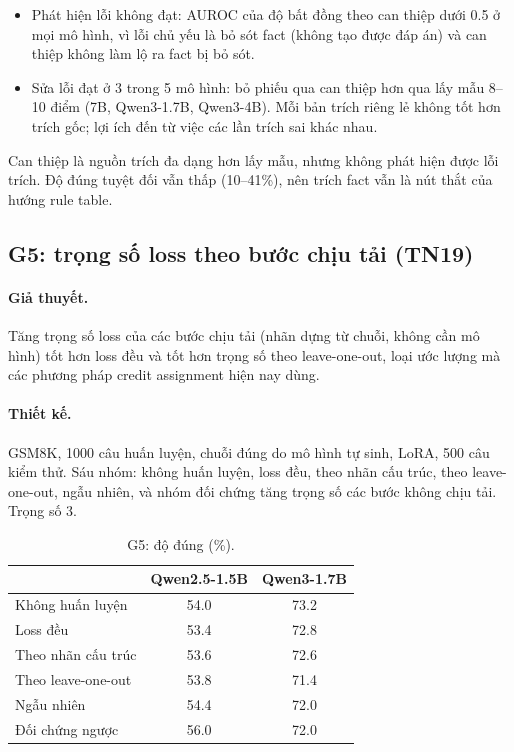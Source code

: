 \documentclass[11pt]{article}
\begin{document}
\begin{cachdoc}
\begin{itemize}[leftmargin=*,itemsep=1pt]
\item Phát hiện lỗi không đạt: AUROC của độ bất đồng theo can thiệp dưới 0.5 ở mọi mô hình, vì lỗi chủ yếu là
  bỏ sót fact (không tạo được đáp án) và can thiệp không làm lộ ra fact bị bỏ sót.
\item Sửa lỗi đạt ở 3 trong 5 mô hình: bỏ phiếu qua can thiệp hơn qua lấy mẫu 8--10 điểm (7B, Qwen3-1.7B,
  Qwen3-4B). Mỗi bản trích riêng lẻ không tốt hơn trích gốc; lợi ích đến từ việc các lần trích sai khác nhau.
\end{itemize}
\end{cachdoc}

\begin{ketluan}
Can thiệp là nguồn trích đa dạng hơn lấy mẫu, nhưng không phát hiện được lỗi trích. Độ đúng tuyệt đối vẫn thấp
(10--41\%), nên trích fact vẫn là nút thắt của hướng rule table.
\end{ketluan}

\subsection{G5: trọng số loss theo bước chịu tải (TN19)}

\paragraph{Giả thuyết.} Tăng trọng số loss của các bước chịu tải (nhãn dựng từ chuỗi, không cần mô hình) tốt
hơn loss đều và tốt hơn trọng số theo leave-one-out, loại ước lượng mà các phương pháp credit assignment hiện
nay dùng.

\paragraph{Thiết kế.} GSM8K, 1000 câu huấn luyện, chuỗi đúng do mô hình tự sinh, LoRA, 500 câu kiểm thử. Sáu
nhóm: không huấn luyện, loss đều, theo nhãn cấu trúc, theo leave-one-out, ngẫu nhiên, và nhóm đối chứng tăng
trọng số các bước không chịu tải. Trọng số 3.

\begin{table}[h]
\centering\small
\caption{G5: độ đúng (\%).}
\begin{tabular}{lcc}
\toprule
 & Qwen2.5-1.5B & Qwen3-1.7B \\
\midrule
Không huấn luyện & 54.0 & 73.2 \\
Loss đều & 53.4 & 72.8 \\
Theo nhãn cấu trúc & 53.6 & 72.6 \\
Theo leave-one-out & 53.8 & 71.4 \\
Ngẫu nhiên & 54.4 & 72.0 \\
Đối chứng ngược & 56.0 & 72.0 \\
\bottomrule
\end{tabular}
\end{table}
\end{document}
